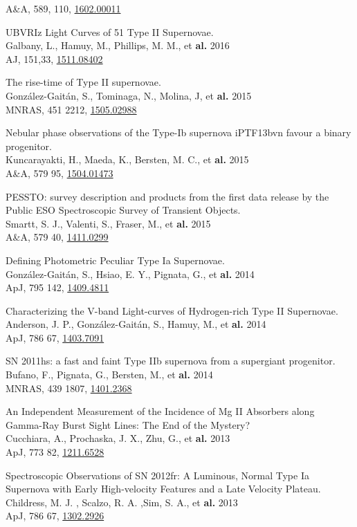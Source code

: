 \documentclass[12pt]{article}
\begin{document}
\begin{bibenum}
A\&A, 589, 110, \href{https://arxiv.org/abs/1602.00011}{1602.00011}
    \item 
UBVRIz Light Curves of 51 Type II Supernovae.\\
Galbany, L., Hamuy, M., Phillips, M. M., et \textbf{al.} 2016\\
AJ, 151,33, \href{http://arxiv.org/abs/1511.08402}{1511.08402}
    \item 
The rise-time of Type II supernovae.\\
Gonz\'alez-Gait\'an, S., Tominaga, N., Molina, J, et \textbf{al.} 2015\\
MNRAS, 451 2212, \href{http://arxiv.org/abs/1505.02988}{1505.02988} 
    \item 
Nebular phase observations of the Type-Ib supernova iPTF13bvn favour a binary progenitor.\\
Kuncarayakti, H., Maeda, K., Bersten, M. C., et \textbf{al.} 2015\\
A\&A, 579 95, \href{http://arxiv.org/abs/1504.01473}{1504.01473}  
    \item 
PESSTO: survey description and products from the first data release by the Public ESO Spectroscopic Survey of Transient Objects.\\
Smartt, S. J., Valenti, S., Fraser, M., et \textbf{al.} 2015\\
A\&A, 579 40, \href{http://arxiv.org/abs/1411.0299}{1411.0299}
    \item 
Defining Photometric Peculiar Type Ia Supernovae.\\
Gonz\'alez-Gait\'an, S., Hsiao, E. Y., Pignata, G., et \textbf{al.} 2014\\
ApJ, 795 142, \href{http://arxiv.org/abs/1409.4811}{1409.4811}    
    \item 
Characterizing the V-band Light-curves of Hydrogen-rich Type II Supernovae.\\
Anderson, J. P., Gonz\'alez-Gait\'an, S., Hamuy, M.,  et \textbf{al.} 2014\\
ApJ, 786 67, \href{http://arxiv.org/abs/1403.7091}{1403.7091} 
    \item 
SN 2011hs: a fast and faint Type IIb supernova from a supergiant progenitor.\\
Bufano, F., Pignata, G., Bersten, M., et \textbf{al.} 2014\\
MNRAS, 439 1807, \href{http://arxiv.org/abs/1401.2368}{1401.2368}
    \item 
An Independent Measurement of the Incidence of Mg II Absorbers along Gamma-Ray Burst Sight Lines: The End of the Mystery?\\
Cucchiara, A., Prochaska, J. X., Zhu, G.,  et \textbf{al.} 2013\\
ApJ, 773 82, \href{http://arxiv.org/abs/1211.6528}{1211.6528} 
    \item 
Spectroscopic Observations of SN 2012fr: A Luminous, Normal Type Ia Supernova with Early High-velocity Features and a Late Velocity Plateau.\\
Childress, M. J. , Scalzo, R. A. ,Sim, S. A.,  et \textbf{al.} 2013\\
ApJ, 786 67, \href{http://arxiv.org/abs/1302.2926}{1302.2926\\} 


\end{bibenum}
\end{document}
